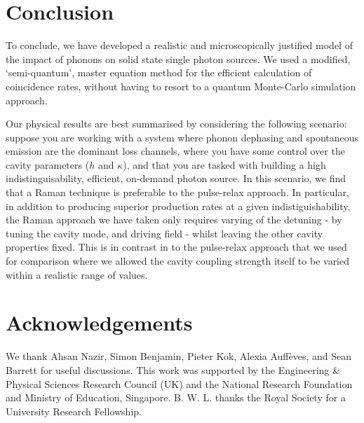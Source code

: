 \section{Conclusion}

To conclude, we have developed a realistic and microscopically justified model of the impact of phonons on solid state single photon sources. We used a modified, `semi-quantum', master equation method for the efficient calculation of coincidence rates, without having to resort to a quantum Monte-Carlo simulation approach.

Our physical results are best summarised by considering the following scenario: suppose you are working with a system where phonon dephasing and spontaneous emission are the dominant loss channels, where you have some control over the cavity parameters ($h$ and $\kappa$), and that you are tasked with building a high indistinguisability, efficient, on-demand photon source. In this scenario, we find that a Raman technique is preferable to the pulse-relax approach. In particular, in addition to producing superior production rates at a given indistiguishability, the Raman approach we have taken only requires varying of the detuning - by tuning the cavity mode, and driving field - whilst leaving the other cavity properties fixed. This is in contrast in to the pulse-relax approach that we used for comparison where we allowed the cavity coupling strength itself to be varied within a realistic range of values. 



\section{Acknowledgements} We thank Ahsan Nazir, Simon Benjamin, Pieter Kok, Alexia Auff\`eves, and Sean Barrett for useful discussions. This work was supported by the Engineering \& Physical Sciences Research Council (UK) and the National Research Foundation and Ministry of Education, Singapore. B. W. L. thanks the Royal Society for a University Research Fellowship. 


